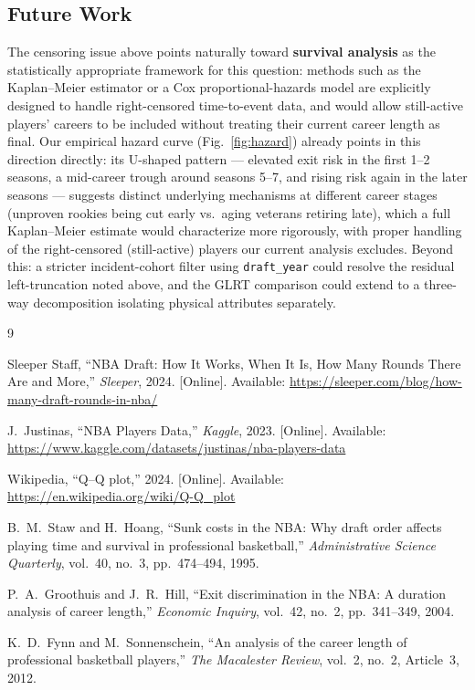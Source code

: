 \documentclass[10pt,twocolumn]{article}
\begin{document}
\subsection{Future Work}
The censoring issue above points naturally toward \textbf{survival
analysis} as the statistically appropriate framework for this
question: methods such as the Kaplan--Meier estimator or a Cox
proportional-hazards model are explicitly designed to handle
right-censored time-to-event data, and would allow still-active
players' careers to be included without treating their current career
length as final. Our empirical hazard curve (Fig.~\ref{fig:hazard})
already points in this direction directly: its U-shaped pattern ---
elevated exit risk in the first 1--2 seasons, a mid-career trough
around seasons 5--7, and rising risk again in the later seasons ---
suggests distinct underlying mechanisms at different career stages
(unproven rookies being cut early vs.\ aging veterans retiring late),
which a full Kaplan--Meier estimate would characterize more
rigorously, with proper handling of the right-censored (still-active)
players our current analysis excludes.
Beyond this: a stricter incident-cohort filter using
\texttt{draft\_year} could resolve the residual left-truncation noted
above, and the GLRT comparison could extend to a three-way
decomposition isolating physical attributes separately.


\setlength{\bibsep}{2pt}
\begin{thebibliography}{9}
\scriptsize

Sleeper Staff, ``NBA Draft: How It Works, When It Is, How Many Rounds
There Are and More,'' \textit{Sleeper}, 2024. [Online]. Available:
\url{https://sleeper.com/blog/how-many-draft-rounds-in-nba/}

J.~Justinas, ``NBA Players Data,'' \textit{Kaggle}, 2023. [Online].
Available: \url{https://www.kaggle.com/datasets/justinas/nba-players-data}

Wikipedia, ``Q--Q plot,'' 2024. [Online]. Available:
\url{https://en.wikipedia.org/wiki/Q-Q_plot}

B.~M.~Staw and H.~Hoang, ``Sunk costs in the NBA: Why draft order
affects playing time and survival in professional basketball,''
\textit{Administrative Science Quarterly}, vol.~40, no.~3, pp.~474--494,
1995.

P.~A.~Groothuis and J.~R.~Hill, ``Exit discrimination in the NBA: A
duration analysis of career length,'' \textit{Economic Inquiry},
vol.~42, no.~2, pp.~341--349, 2004.

K.~D.~Fynn and M.~Sonnenschein, ``An analysis of the career length of
professional basketball players,'' \textit{The Macalester Review},
vol.~2, no.~2, Article~3, 2012.

\end{thebibliography}
\end{document}
